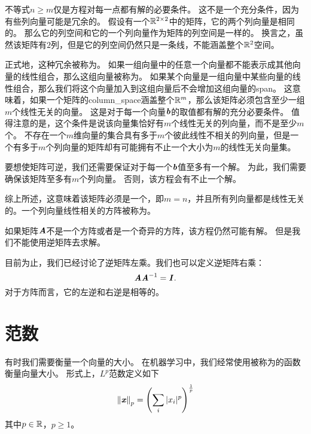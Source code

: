 

不等式$n\geq m$仅是方程对每一点都有解的必要条件。
这不是一个充分条件，因为有些列向量可能是冗余的。
假设有一个$\mathbb{R}^{2\times 2}$中的矩阵，它的两个列向量是相同的。
那么它的列空间和它的一个列向量作为矩阵的列空间是一样的。
换言之，虽然该矩阵有$2$列，但是它的列空间仍然只是一条线，不能涵盖整个$\mathbb{R}^2$空间。


正式地，这种冗余被称为。
如果一组向量中的任意一个向量都不能表示成其他向量的线性组合，那么这组向量被称为。
如果某个向量是一组向量中某些向量的线性组合，那么我们将这个向量加入到这组向量后不会增加这组向量的\gls{span}。
这意味着，如果一个矩阵的\gls{column_space}涵盖整个$\mathbb{R}^m$，那么该矩阵必须包含至少一组$m$个线性无关的向量。
这是对于每一个向量$\boldsymbol{\mathit{b}}$的取值都有解的充分必要条件。
值得注意的是，这个条件是说该向量集恰好有$m$个线性无关的列向量，而不是至少$m$个。
不存在一个$m$维向量的集合具有多于$m$个彼此线性不相关的列向量，但是一个有多于$m$个列向量的矩阵却有可能拥有不止一个大小为$m$的线性无关向量集。


要想使矩阵可逆，我们还需要保证对于每一个$\boldsymbol{\mathit{b}}$值至多有一个解。
为此，我们需要确保该矩阵至多有$m$个列向量。
否则，该方程会有不止一个解。


综上所述，这意味着该矩阵必须是一个，即$m=n$，并且所有列向量都是线性无关的。一个列向量线性相关的方阵被称为。


如果矩阵$\boldsymbol{\mathit{A}}$不是一个方阵或者是一个奇异的方阵，该方程仍然可能有解。
但是我们不能使用逆矩阵去求解。


目前为止，我们已经讨论了逆矩阵左乘。我们也可以定义逆矩阵右乘：
\begin{equation}
\boldsymbol{\mathit{A}}\boldsymbol{\mathit{A}}^{-1}=\boldsymbol{\mathit{I}}.
\end{equation}
对于方阵而言，它的左逆和右逆是相等的。




\section{范数}
\label{sec:norms}

有时我们需要衡量一个向量的大小。
在机器学习中，我们经常使用被称为的函数衡量向量大小。
形式上，$L^p$范数定义如下
\begin{equation}
\label{eq:2.30}
    \left\lVert\boldsymbol{\mathit{x}}\right\rVert_p = \left( \sum_i |x_i|^p \right)^{\frac{1}{p}}
\end{equation}
其中$p\in \mathbb{R}$，$p\geq 1$。



